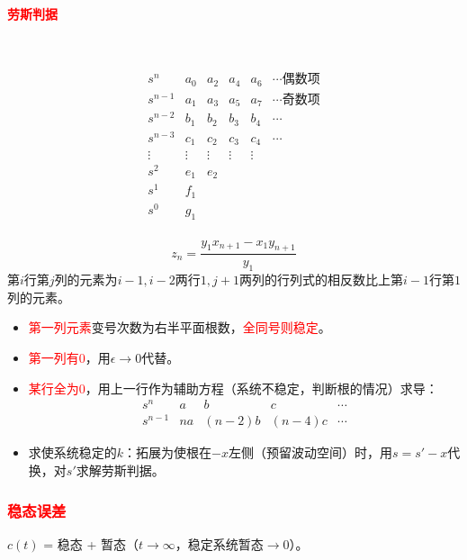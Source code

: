 \documentclass[
12pt, %
a4paper, 
oneside, %
]{scrartcl}
\begin{document}
\paragraph{\textcolor{red}{劳斯判据}}~\\
\begin{minipage}[t]{0.6\textwidth}
$$ \begin{array}{cccccc} s^n & a_0 & a_2 & a_4 & a_6 & \cdots \text{偶数项} \\ s^{n - 1} & a_1 & a_3 & a_5 & a_7 & \cdots \text{奇数项} \\ s^{n - 2} & b_1 & b_2 & b_3 & b_4 & \cdots \\ s^{n - 3} & c_1 & c_2 & c_3 & c_4 & \cdots \\ \vdots & \vdots & \vdots & \vdots & \vdots & \\ s^2 & e_1 & e_2 \\ s^1 & f_1 \\ s^0 & g_1 \\ \end{array} $$
\end{minipage}
\begin{minipage}[t]{0.4\textwidth}
$$ z_n = \frac{y_1 x_{n + 1} - x_1 y_{n + 1}}{y_1} $$
\hspace{2em}
第$ i $行第$ j $列的元素为$ i - 1, i - 2 $两行$ 1, j + 1 $两列的行列式的相反数比上第$ i - 1 $行第$ 1 $列的元素。
\end{minipage}

\begin{itemize}
\item \textcolor{red}{第一列元素}变号次数为右半平面根数，\textcolor{red}{全同号则稳定}。
\item \textcolor{red}{第一列有$ 0 $}，用$ \epsilon \to 0 $代替。
\item \textcolor{red}{某行全为$ 0 $}，用上一行作为辅助方程（系统不稳定，判断根的情况）求导：
$$ \begin{array}{ccccc} s^n & a & b & c & \cdots \\ s^{n - 1} & na & (n - 2)b & (n - 4)c & \cdots \end{array} $$
\item 求使系统稳定的$ k $：拓展为使根在$ -x $左侧（预留波动空间）时，用$ s = s' - x $代换，对$ s' $求解劳斯判据。
\end{itemize}
\subsubsection[稳态误差]{\textcolor{red}{稳态误差}}
$ c(t) $ = 稳态 + 暂态（$ t \to \infty $，稳定系统暂态$ \to 0 $）。
\end{document}
